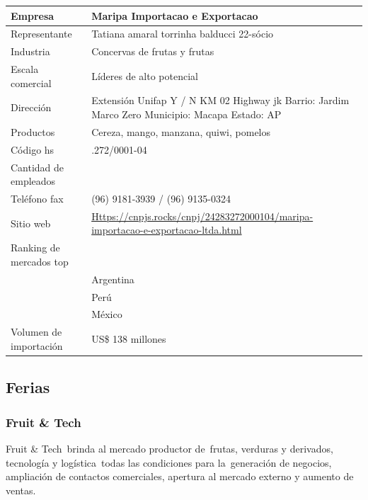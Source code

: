 \documentclass[
  stu,
  floatsintext,
  longtable,
  a4paper,
  nolmodern,
  notxfonts,
  notimes,
  colorlinks=true,linkcolor=blue,citecolor=blue,urlcolor=blue]{apa7}
\begin{document}
\begin{longtable}[]{@{}
  >{\raggedright\arraybackslash}p{}
  >{\raggedright\arraybackslash}p{}@{}}
\toprule\noalign{}
\begin{minipage}[b]{\linewidth}\raggedright
\textbf{Empresa}
\end{minipage} & \begin{minipage}[b]{\linewidth}\raggedright
\textbf{Maripa Importacao e Exportacao}
\end{minipage} \\
\midrule\noalign{}
\endhead
\bottomrule\noalign{}
\endlastfoot
Representante & Tatiana amaral torrinha balducci 22-sócio \\
Industria & Concervas de frutas y frutas \\
Escala comercial & Líderes de alto potencial \\
Dirección & Extensión Unifap Y / N KM 02 Highway jk Barrio: Jardim Marco
Zero Municipio: Macapa Estado: AP \\
Productos & Cereza, mango, manzana, quiwi, pomelos \\
Código hs & 24.283.272/0001-04 \\
Cantidad de empleados & 1123 \\
Teléfono fax & (96) 9181-3939 / (96) 9135-0324 \\
Sitio web &
\url{Https://cnpjs.rocks/cnpj/24283272000104/maripa-importacao-e-exportacao-ltda.html} \\
Ranking de mercados top & \\
& Argentina \\
& Perú \\
& México \\
Volumen de importación & US\$ 138 millones \\
\end{longtable}

\subsection{Ferias}\label{ferias}

\subsubsection{Fruit \& Tech}\label{fruit-tech}

Fruit \& Tech~brinda al mercado productor de~frutas, verduras y
derivados, tecnología y logística~todas las condiciones para
la~generación de negocios, ampliación de contactos comerciales, apertura
al mercado externo y aumento de ventas.
\end{document}
